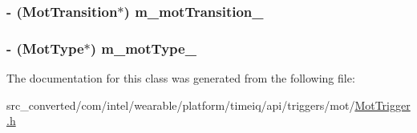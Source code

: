\subsubsection[{m\+\_\+mot\+Transition\+\_\+}]{\setlength{\rightskip}{0pt plus 5cm}-\/ ({\bf Mot\+Transition}$\ast$) m\+\_\+mot\+Transition\+\_\+}\label{interface_mot_trigger_a5b75f5881ecc975d696ba31b65302aea}
\hypertarget{interface_mot_trigger_aa685522ddd973b223d35685afdd662ff}{}
\subsubsection[{m\+\_\+mot\+Type\+\_\+}]{\setlength{\rightskip}{0pt plus 5cm}-\/ (Mot\+Type$\ast$) m\+\_\+mot\+Type\+\_\+}\label{interface_mot_trigger_aa685522ddd973b223d35685afdd662ff}


The documentation for this class was generated from the following file\+:\begin{DoxyCompactItemize}
\item 
src\+\_\+converted/com/intel/wearable/platform/timeiq/api/triggers/mot/\hyperlink{_mot_trigger_8h}{Mot\+Trigger.\+h}\end{DoxyCompactItemize}
